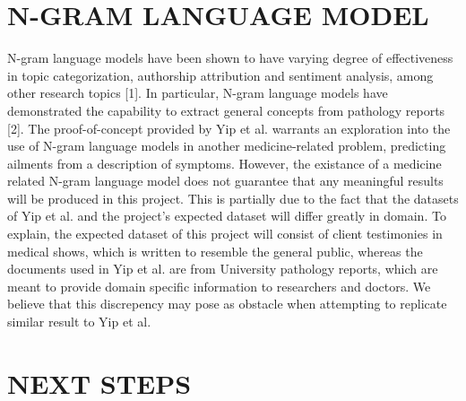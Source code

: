 \documentclass[12pt, final, onecolumn, comsoc, conference]{IEEEtran}
\begin{document}
\section{\MakeTextUppercase{N-Gram Language Model}}
N-gram language models have been shown to have varying degree of effectiveness in topic categorization,
authorship attribution and sentiment analysis, among other research topics [1]. In particular, N-gram language
models have demonstrated the capability to extract general concepts from pathology reports [2].
The proof-of-concept provided by Yip et al. warrants an exploration into the use of N-gram language models
in another medicine-related problem, predicting ailments from a description of symptoms.
However, the existance of a medicine related N-gram language model does not guarantee that any
meaningful results will be produced in this project. This is partially due to the fact that
the datasets of Yip et al. and the project's expected dataset will differ greatly in domain. 
To explain, the expected dataset of this project will consist
of client testimonies in medical shows, which is written to resemble the general public, 
whereas the documents used in Yip et al. are from University
pathology reports, which are meant to provide domain specific information to researchers and doctors.
We believe that this discrepency may pose as obstacle when attempting to replicate similar result  
to Yip et al.

\section{\MakeUppercase{Next Steps}}
\end{document}
